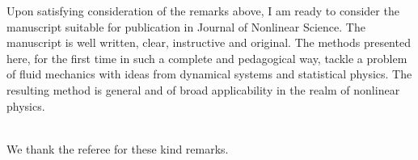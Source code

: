 \documentclass[11pt]{article}
\newcommand{\comment}[1]{{\color{blue} #1}}
\begin{document}
\noindent
\comment{
Upon satisfying consideration of the remarks above, I am ready to consider the manuscript suitable for publication in Journal of Nonlinear Science. The manuscript is well written, clear, instructive and original. The methods presented here, for the first time in such a complete and pedagogical way, tackle a problem of fluid mechanics with ideas from dynamical systems and statistical physics. The resulting method is general and of broad applicability in the realm of nonlinear physics.
}

\noindent
\\We thank the referee for these kind remarks.
\end{document}
